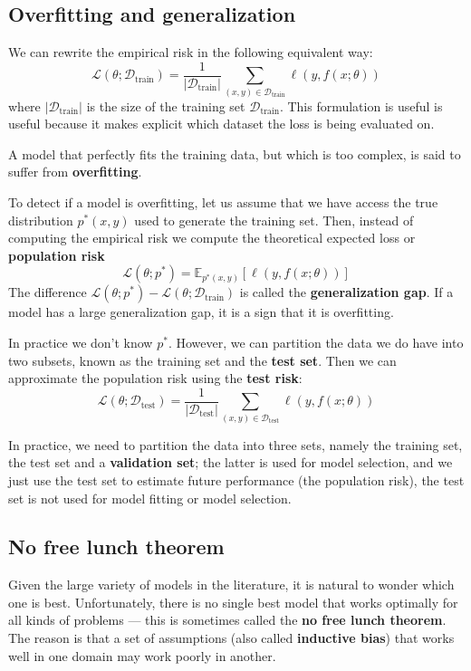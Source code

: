 \subsection{Overfitting and generalization}
We can rewrite the empirical risk in the following equivalent way:
\begin{equation}
\mathcal{L}(\theta;\mathcal{D}_{\operatorname{train}}) = \frac{1}{|\mathcal{D}_{\operatorname{train}}|}\sum_{(x,y)\in \mathcal{D}_{\operatorname{train}}}\ell(y, f(x;\theta))
\end{equation}
where $|\mathcal{D}_{\operatorname{train}}|$ is the size of the training set $\mathcal{D}_{\operatorname{train}}$. This formulation is useful is useful because it makes explicit which dataset the loss is being evaluated on.
\par
A model that perfectly fits the training data, but which is too complex, is said to suffer from \textbf{overfitting}.
\par
To detect if a model is overfitting, let us assume that we have access the true distribution $p^*(x,y)$ used to generate the training set. Then, instead of computing the empirical risk we compute the theoretical expected loss or \textbf{population risk}
\begin{equation}
\mathcal{L}(\theta;p^*) = \mathbb{E}_{p^*(x,y)}[\ell(y, f(x;\theta))]
\end{equation}
The difference $\mathcal{L}(\theta;p^*) - \mathcal{L}(\theta;\mathcal{D}_{\operatorname{train}})$ is called the \textbf{generalization gap}. If a model has a large generalization gap, it is a sign that it is overfitting.
\par
In practice we don't know $p^*$. However, we can partition the data we do have into two subsets, known as the training set and the \textbf{test set}. Then we can approximate the population risk using the \textbf{test risk}:
\begin{equation}
\mathcal{L}(\theta;\mathcal{D}_{\operatorname{test}}) = \frac{1}{|\mathcal{D}_{\operatorname{test}}|}\sum_{(x,y)\in \mathcal{D}_{\operatorname{test}}}\ell(y, f(x;\theta))
\end{equation}
\par
In practice, we need to partition the data into three sets, namely the training set, the test set and a \textbf{validation set}; the latter is used for model selection, and we just use the test set to estimate future performance (the population risk),  the test set is not used for model fitting or model selection.
\subsection{No free lunch theorem}
Given the large variety of models in the literature, it is natural to wonder which one is best. Unfortunately, there is no single best model that works optimally for all kinds of problems — this is sometimes called the \textbf{no free lunch theorem}. The reason is that a set of assumptions (also called \textbf{inductive bias}) that works well in one domain may work poorly in another. 
